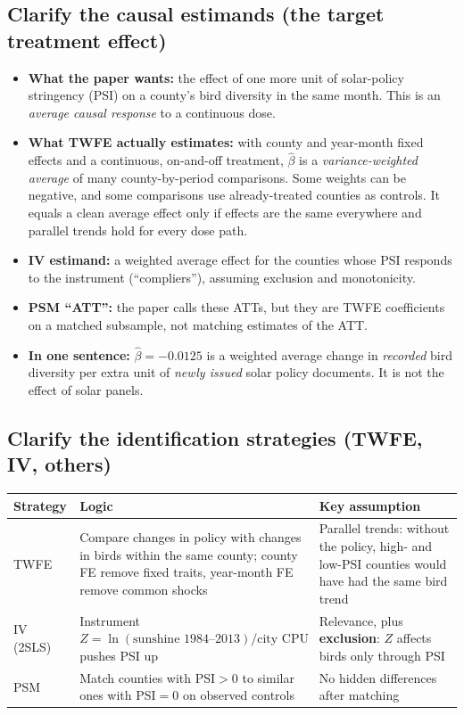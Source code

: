 \documentclass[11pt]{article}
\begin{document}
\subsection{Clarify the causal estimands (the target treatment effect)}
\begin{itemize}
\item \textbf{What the paper wants:} the effect of one more unit of solar-policy stringency (PSI) on a county's bird diversity in the same month. This is an \emph{average causal response} to a continuous dose.
\item \textbf{What TWFE actually estimates:} with county and year-month fixed effects and a continuous, on-and-off treatment, $\hat\beta$ is a \emph{variance-weighted average} of many county-by-period comparisons. Some weights can be negative, and some comparisons use already-treated counties as controls. It equals a clean average effect only if effects are the same everywhere and parallel trends hold for every dose path.
\item \textbf{IV estimand:} a weighted average effect for the counties whose PSI responds to the instrument (``compliers''), assuming exclusion and monotonicity.
\item \textbf{PSM ``ATT'':} the paper calls these ATTs, but they are TWFE coefficients on a matched subsample, not matching estimates of the ATT.
\item \textbf{In one sentence:} $\hat\beta = -0.0125$ is a weighted average change in \emph{recorded} bird diversity per extra unit of \emph{newly issued} solar policy documents. It is not the effect of solar panels.
\end{itemize}

\subsection{Clarify the identification strategies (TWFE, IV, others)}

\begin{table}[H]\centering\small
\begin{tabularx}{\linewidth}{l>{\raggedright\arraybackslash}X>{\raggedright\arraybackslash}X}
\toprule
Strategy & Logic & Key assumption\\
\midrule
TWFE & Compare changes in policy with changes in birds within the same county; county FE remove fixed traits, year-month FE remove common shocks & Parallel trends: without the policy, high- and low-PSI counties would have had the same bird trend\\
IV (2SLS) & Instrument $Z=\ln(\text{sunshine 1984--2013})/\text{city CPU}$ pushes PSI up & Relevance, plus \textbf{exclusion}: $Z$ affects birds only through PSI\\
PSM & Match counties with PSI$>0$ to similar ones with PSI$=0$ on observed controls & No hidden differences after matching\\
\bottomrule
\end{tabularx}
\end{table}
\end{document}
